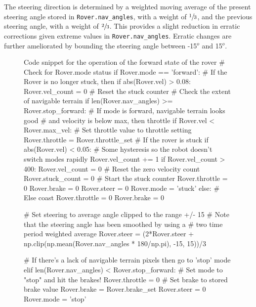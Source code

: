 \documentclass[a4paper]{article}
\begin{document}
The steering direction is determined by a weighted moving average of the present steering angle stored in \verb|Rover.nav_angles|, with a weight of $\sfrac{1}{3}$, and the previous steering angle, with a weight of $\sfrac{2}{3}$. This provides a slight reduction in erratic corrections given extreme values in \verb|Rover.nav_angles|. Erratic changes are further ameliorated by bounding the steering angle between -15$^o$ and 15$^o$.

\vspace{2cm}

\begin{figure}[h]\scriptsize
\begin{sexylisting}{Code snippet for the operation of the forward state of the rover}
# Check for Rover.mode status
        if Rover.mode == 'forward':
            # If the Rover is no longer stuck, then 
            if abs(Rover.vel) > 0.08:
                Rover.vel_count = 0 # Reset the stuck counter
            # Check the extent of navigable terrain
            if len(Rover.nav_angles) >= Rover.stop_forward:  
                # If mode is forward, navigable terrain looks good 
                # and velocity is below max, then throttle 
                if Rover.vel < Rover.max_vel:
                    # Set throttle value to throttle setting
                    Rover.throttle = Rover.throttle_set
                    # If the rover is stuck
                    if abs(Rover.vel) < 0.05:
                        # Some hysteresis so the robot doesn't switch modes rapidly
                        Rover.vel_count += 1
                        if Rover.vel_count > 400:
                            Rover.vel_count = 0 # Reset the zero velocity count
                            Rover.stuck_count = 0 # Start the stuck counter
                            Rover.throttle = 0
                            Rover.brake = 0
                            Rover.steer = 0
                            Rover.mode = 'stuck'
                else: # Else coast
                    Rover.throttle = 0
                Rover.brake = 0
                
                # Set steering to average angle clipped to the range +/- 15
                # Note that the steering angle has been smoothed by using a
                # two time period weighted average
                Rover.steer =
	                (2*Rover.steer +
		                 np.clip(np.mean(Rover.nav_angles * 180/np.pi), -15, 15))/3
                
            # If there's a lack of navigable terrain pixels then go to 'stop' mode
            elif len(Rover.nav_angles) < Rover.stop_forward:
                    # Set mode to "stop" and hit the brakes!
                    Rover.throttle = 0
                    # Set brake to stored brake value
                    Rover.brake = Rover.brake_set
                    Rover.steer = 0
                    Rover.mode = 'stop'
\end{sexylisting}
\end{figure}
\end{document}
